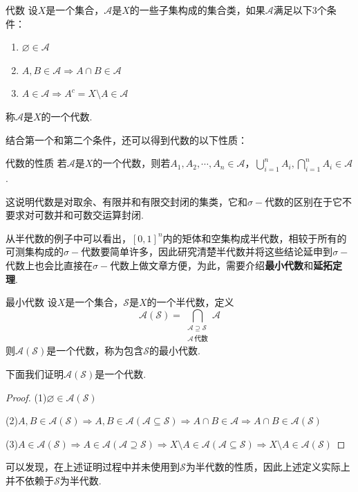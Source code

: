 \documentclass[lang=cn,a4paper,11pt,openany,scheme=chinese,twoside]{elegantbook}
\newcommand{\bluebf}[1]{\textcolor{structurecolor}{\textbf{#1}}}
\begin{document}
\begin{definition}{代数}
    设$X$是一个集合，$\mathcal{A}$是$X$的一些子集构成的集合类，如果$\mathcal{A}$满足以下3个条件：
    \begin{enumerate}
        \item $\varnothing\in\mathcal{A}$
        \item $A,B\in\mathcal{A}\Rightarrow A\cap B\in\mathcal{A}$
        \item $A\in\mathcal{A}\Rightarrow A^c=X\setminus A\in\mathcal{A}$
    \end{enumerate}
    称$\mathcal{A}$是$X$的一个代数.
\end{definition}
结合第一个和第二个条件，还可以得到代数的以下性质：
\begin{proposition}{代数的性质}
    若$\mathcal{A}$是$X$的一个代数，则若$A_1,A_2,\cdots,A_n\in\mathcal{A}$，$\bigcup_{i=1}^n{A_i},\bigcap_{i=1}^n{A_i}\in\mathcal{A}$.
\end{proposition}
这说明代数是对取余、有限并和有限交封闭的集类，它和$\sigma-$代数的区别在于它不要求对可数并和可数交运算封闭.\par
从半代数的例子中可以看出，$[0,1]^n$内的矩体和空集构成半代数，相较于所有的可测集构成的$\sigma-\text{代数}$要简单许多，因此研究清楚半代数并将这些结论延申到$\sigma-$代数上也会比直接在$\sigma-$代数上做文章方便，为此，需要介绍\bluebf{最小代数}和\bluebf{延拓定理}.\par
\begin{definition}{最小代数}
    设$X$是一个集合，$\mathcal{S}$是$X$的一个半代数，定义\[\mathcal{A}(\mathcal{S})=\bigcap_{\substack{\mathcal{A}\supseteq\mathcal{S}\\\mathcal{A}\,\text{代数}}}{\mathcal{A}}\]
    则$\mathcal{A}(\mathcal{S})$是一个代数，称为包含$\mathcal{S}$的最小代数.
\end{definition}
下面我们证明$\mathcal{A}(\mathcal{S})$是一个代数.
\begin{proof}
    (1)$\varnothing\in\mathcal{A}(\mathcal{S})$\par
    (2)$A,B\in\mathcal{A}(\mathcal{S})\Rightarrow A,B\in\mathcal{A}(\mathcal{A}\subseteq\mathcal{S}) \Rightarrow A\cap B\in\mathcal{A}\Rightarrow A\cap B\in\mathcal{A}(\mathcal{S})$\par
    (3)$A\in\mathcal{A}(\mathcal{S})\Rightarrow A\in\mathcal{A}(\mathcal{A}\supseteq\mathcal{S}) \Rightarrow X\setminus A\in\mathcal{A}(\mathcal{A}\subseteq\mathcal{S})\Rightarrow X\setminus A\in\mathcal{A}(\mathcal{S})$
\end{proof}
\begin{remark}
    可以发现，在上述证明过程中并未使用到$\mathcal{S}$为半代数的性质，因此上述定义实际上并不依赖于$\mathcal{S}$为半代数.
\end{remark}
\end{document}
